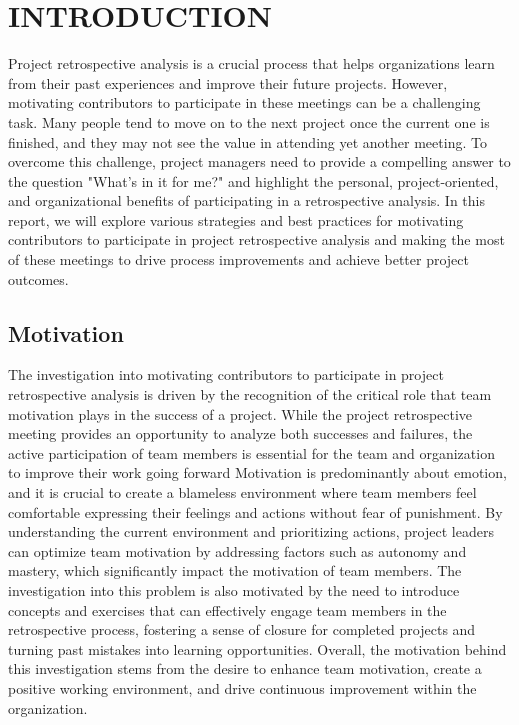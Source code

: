\documentclass{article}
\begin{document}
\newpage

\section{INTRODUCTION} 
\noindent Project retrospective analysis is a crucial process that helps organizations learn from their past experiences and improve their future projects. However, motivating contributors to participate in these meetings can be a challenging task. Many people tend to move on to the next project once the current one is finished, and they may not see the value in attending yet another meeting. To overcome this challenge, project managers need to provide a compelling answer to the question "What's in it for me?" and highlight the personal, project-oriented, and organizational benefits of participating in a retrospective analysis. In this report, we will explore various strategies and best practices for motivating contributors to participate in project retrospective analysis and making the most of these meetings to drive process improvements and achieve better project outcomes. \cite{5784234}

\subsection{Motivation}
The investigation into motivating contributors to participate in project retrospective analysis is driven by the recognition of the critical role that team motivation plays in the success of a project. While the project retrospective meeting provides an opportunity to analyze both successes and failures, the active participation of team members is essential for the team and organization to improve their work going forward Motivation is predominantly about emotion, and it is crucial to create a blameless environment where team members feel comfortable expressing their feelings and actions without fear of punishment. By understanding the current environment and prioritizing actions, project leaders can optimize team motivation by addressing factors such as autonomy and mastery, which significantly impact the motivation of team members. The investigation into this problem is also motivated by the need to introduce concepts and exercises that can effectively engage team members in the retrospective process, fostering a sense of closure for completed projects and turning past mistakes into learning opportunities. Overall, the motivation behind this investigation stems from the desire to enhance team motivation, create a positive working environment, and drive continuous improvement within the organization.
\end{document}
